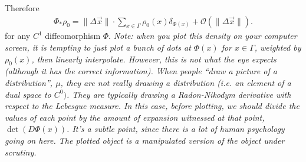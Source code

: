 \documentclass[12pt]{amsart}
\begin{document}
Therefore
\begin{align*}
	\Phi_* \rho_0 = \| \Delta \vec{x} \| \cdot \sum_{x \in \Gamma} \rho_0( x ) \delta_{ \Phi(x) } + \mathcal{O}( \| \Delta \vec{x} \| ).
\end{align*}
for any $C^1$ diffeomorphism $\Phi$.
\emph{Note: when you plot this density on your computer screen, it is tempting to just plot a bunch of dots at $\Phi(x)$ for $x \in \Gamma$,
weighted by $\rho_0(x)$, then linearly interpolate.
However, this is not what the eye expects (although it has the correct information).
When people ``draw a picture of a distribution'', $\mu$, they are not really drawing a distribution (i.e. an element of a dual space to $C^0)$.
They are typically drawing a Radon-Nikodym derivative with respect to the Lebesgue measure.
In this case, before plotting, we should divide the values of each point by the amount of expansion witnessed at that point, $\det( D\Phi(x) )$.
It's a subtle point, since there is a lot of human psychology going on here.
The plotted object is a manipulated version of the object under scrutiny.}






\end{document}

